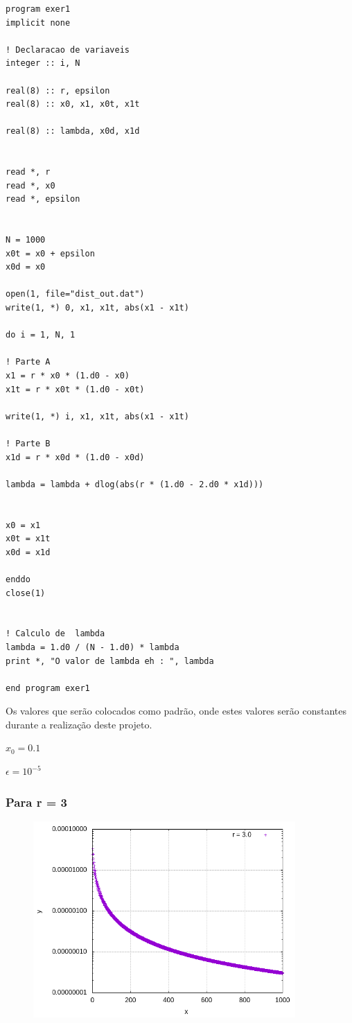 \documentclass[a4paper, 12pt]{article}
\begin{document}
\begin{lstlisting}
program exer1
implicit none

! Declaracao de variaveis
integer :: i, N

real(8) :: r, epsilon
real(8) :: x0, x1, x0t, x1t

real(8) :: lambda, x0d, x1d


read *, r
read *, x0
read *, epsilon


N = 1000
x0t = x0 + epsilon
x0d = x0

open(1, file="dist_out.dat")
write(1, *) 0, x1, x1t, abs(x1 - x1t)

do i = 1, N, 1

! Parte A
x1 = r * x0 * (1.d0 - x0)
x1t = r * x0t * (1.d0 - x0t)

write(1, *) i, x1, x1t, abs(x1 - x1t)

! Parte B
x1d = r * x0d * (1.d0 - x0d)

lambda = lambda + dlog(abs(r * (1.d0 - 2.d0 * x1d)))


x0 = x1
x0t = x1t
x0d = x1d

enddo
close(1)


! Calculo de  lambda
lambda = 1.d0 / (N - 1.d0) * lambda
print *, "O valor de lambda eh : ", lambda

end program exer1

\end{lstlisting}


Os valores que serão colocados como padrão, onde estes valores serão constantes durante a realização deste projeto.

$x_0 = 0.1$

$\epsilon = 10^{-5}$


\subsubsection{Para r = 3}


\begin{figure}[H]
	\centering
	\caption{}{}
	\includegraphics[width=10.0cm]{Chaosr=3_0.png}
	\label{fig:chaos_3_0}
\end{figure}
\end{document}
